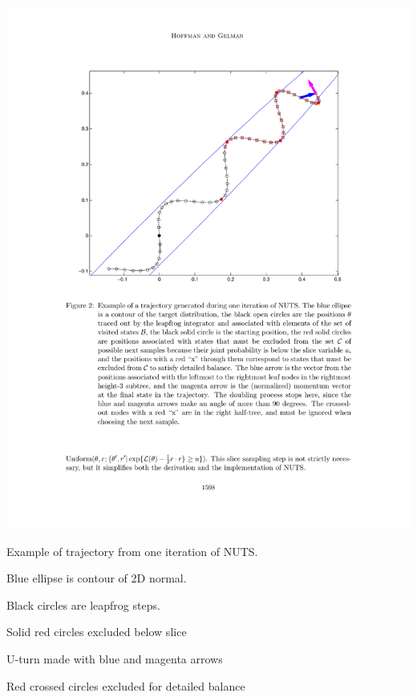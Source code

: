 \documentclass[10pt]{report}
\begin{document}
\\[4pt]
\hspace*{8pt}
\begin{minipage}{0.65\textwidth}
\includegraphics[width=\textwidth]{img/NUTS-trajectory.pdf}
\end{minipage}
\hspace*{-24pt}
\begin{minipage}{0.35\textwidth}
\footnotesize
\begin{subsubitemize}
\item Example of trajectory from one iteration of NUTS.
\item Blue ellipse
  is contour of 2D normal.  
\item Black circles are leapfrog steps.
\item Solid red circles excluded below slice
\item U-turn made with blue and magenta
  arrows
\item  Red crossed circles excluded for detailed balance
\end{subsubitemize}
\end{minipage}
\end{document}
